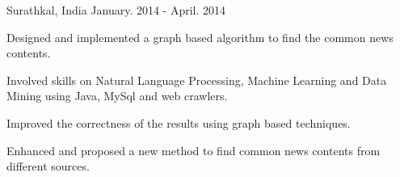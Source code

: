 \begin{cventries}
    {Surathkal, India}
    {January. 2014 - April. 2014}
    {
      \begin{cvitems}
        \item {Designed and implemented a graph based algorithm to find the common news contents.}
        \item{Involved skills on Natural Language Processing, Machine Learning and Data Mining using Java, MySql and web crawlers.}
        \item{Improved the correctness of the results using graph based techniques.}
        \item{Enhanced and proposed a new method to find common news contents from different sources.}
      \end{cvitems}
    }
    

\end{cventries}
